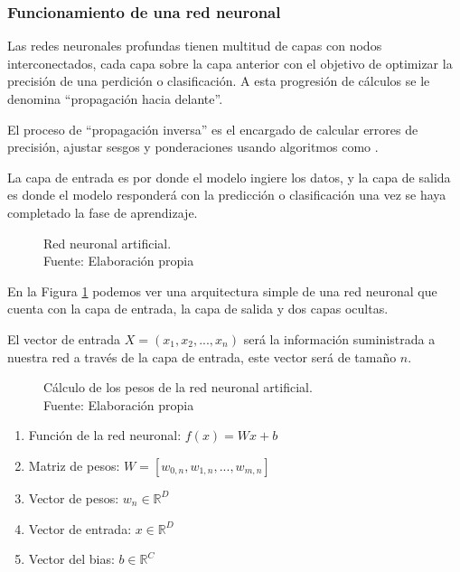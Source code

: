 


\subsubsection{Funcionamiento de una red neuronal\label{neural-network}}

Las redes neuronales profundas tienen multitud de capas con nodos interconectados, cada capa sobre la capa anterior con el objetivo de optimizar la precisión de una perdición o clasificación. A esta progresión de cálculos se le denomina ``propagación hacia delante''.

El proceso de ``propagación inversa'' es el encargado de calcular errores de precisión, ajustar sesgos y ponderaciones usando algoritmos como .

La capa de entrada es por donde el modelo ingiere los datos, y la capa de salida es donde el modelo responderá con la predicción o clasificación una vez se haya completado la fase de aprendizaje.

\begin{figure}[H]
    \centering
    \centerline{}
    \caption{Red neuronal artificial.\\Fuente: Elaboración propia}
    \label{fig:artificial-neuronal-network}
\end{figure}

En la Figura \ref{fig:artificial-neuronal-network} podemos ver una arquitectura simple de una red neuronal que cuenta con la capa de entrada, la capa de salida y dos capas ocultas.

El vector de entrada $X = (x_{1}, x_{2}, ..., x_{n})$ será la información suministrada a nuestra red a través de la capa de entrada, este vector será de tamaño $n$.

\begin{figure}[H]
    \centering
    \captionsetup{justification=centering}
    \centerline{}
    \caption{Cálculo de los pesos de la red neuronal artificial.\\Fuente: Elaboración propia}
    \label{fig:notation}
\end{figure}

\begin{enumerate}
    \item Función de la red neuronal: $f(x) = W x + b$
    \item Matriz de pesos: $W = \left[w_{0,n}, w_{1,n}, ...,w_{m,n}\right]$
    \item Vector de pesos: $w_{n} \in \mathbb{R}^{D}$
    \item Vector de entrada: $x \in \mathbb{R}^{D}$
    \item Vector del bias: $b \in \mathbb{R}^{C}$
\end{enumerate}

